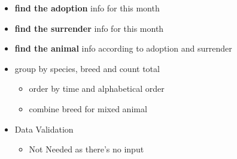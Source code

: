 \documentclass[a4paper]{article}
\begin{document}
\begin{itemize}
	\item \textbf{find the adoption} info for this month
	\item \textbf{find the surrender} info for this month
    \item \textbf{find the animal} info according to adoption and surrender
\item group by species, breed and count total
    \begin{itemize}
        \item  order by time and alphabetical order
        \item combine breed for mixed animal

    \end{itemize}

    \item Data Validation
    \begin{itemize}

        \item Not Needed as there's no input

    \end{itemize}


\end{itemize}
\end{document}
